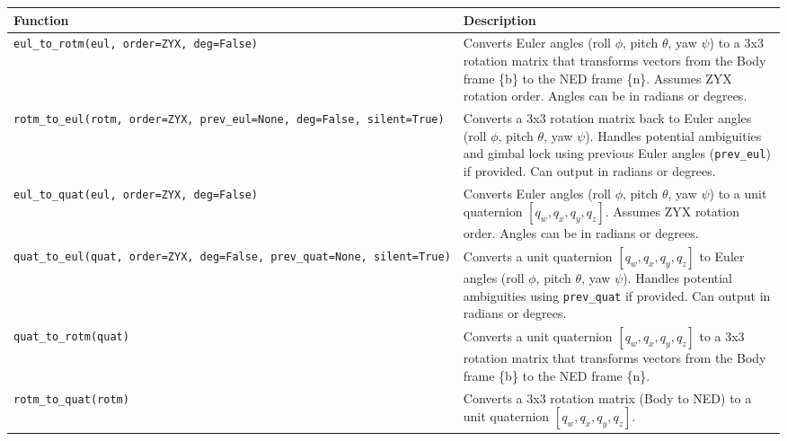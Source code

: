 \documentclass[
  letterpaper,
  DIV=11,
  numbers=noendperiod]{scrreprt}
\begin{document}
\begin{longtable}[]{@{}
  >{\raggedright\arraybackslash}p{}
  >{\raggedright\arraybackslash}p{}@{}}
\toprule\noalign{}
\begin{minipage}[b]{\linewidth}\raggedright
Function
\end{minipage} & \begin{minipage}[b]{\linewidth}\raggedright
Description
\end{minipage} \\
\midrule\noalign{}
\endhead
\bottomrule\noalign{}
\endlastfoot
\texttt{eul\_to\_rotm(eul,\ order=\textquotesingle{}ZYX\textquotesingle{},\ deg=False)}
& Converts Euler angles (roll \(\phi\), pitch \(\theta\), yaw \(\psi\))
to a 3x3 rotation matrix that transforms vectors from the Body frame
\{b\} to the NED frame \{n\}. Assumes ZYX rotation order. Angles can be
in radians or degrees. \\
\texttt{rotm\_to\_eul(rotm,\ order=\textquotesingle{}ZYX\textquotesingle{},\ prev\_eul=None,\ deg=False,\ silent=True)}
& Converts a 3x3 rotation matrix back to Euler angles (roll \(\phi\),
pitch \(\theta\), yaw \(\psi\)). Handles potential ambiguities and
gimbal lock using previous Euler angles (\texttt{prev\_eul}) if
provided. Can output in radians or degrees. \\
\texttt{eul\_to\_quat(eul,\ order=\textquotesingle{}ZYX\textquotesingle{},\ deg=False)}
& Converts Euler angles (roll \(\phi\), pitch \(\theta\), yaw \(\psi\))
to a unit quaternion \([q_w, q_x, q_y, q_z]\). Assumes ZYX rotation
order. Angles can be in radians or degrees. \\
\texttt{quat\_to\_eul(quat,\ order=\textquotesingle{}ZYX\textquotesingle{},\ deg=False,\ prev\_quat=None,\ silent=True)}
& Converts a unit quaternion \([q_w, q_x, q_y, q_z]\) to Euler angles
(roll \(\phi\), pitch \(\theta\), yaw \(\psi\)). Handles potential
ambiguities using \texttt{prev\_quat} if provided. Can output in radians
or degrees. \\
\texttt{quat\_to\_rotm(quat)} & Converts a unit quaternion
\([q_w, q_x, q_y, q_z]\) to a 3x3 rotation matrix that transforms
vectors from the Body frame \{b\} to the NED frame \{n\}. \\
\texttt{rotm\_to\_quat(rotm)} & Converts a 3x3 rotation matrix (Body to
NED) to a unit quaternion \([q_w, q_x, q_y, q_z]\). \\
\end{longtable}
\end{document}
